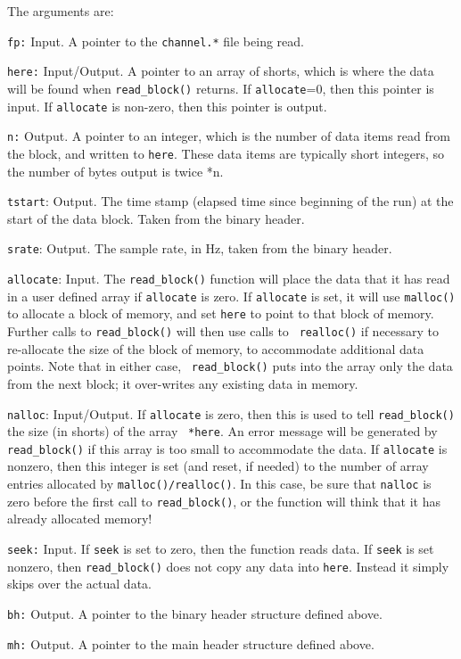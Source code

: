 The arguments are:
\begin{description}
\item{\tt fp:} Input.  A pointer to the {\tt channel.*} file being read.
\item{\tt here:} Input/Output. A pointer to an array of shorts, which
is where the data will be found when {\tt read\_block()} returns.  If
{\tt allocate}=0, then this pointer is input.  If {\tt allocate} is
non-zero, then this pointer is output.
\item{\tt n:} Output.  A pointer to an integer, which is the number of
data items read from the block, and written to {\tt *here}.  These data
items are typically short integers, so the number of bytes output is
twice *n.
\item{\tt tstart}: Output.  The time stamp (elapsed time since beginning of
the run) at the start of the data block.  Taken from the binary
header.
\item{\tt srate}: Output.  The sample rate, in Hz, taken from the binary
header.
\item{\tt allocate}:  Input.   The {\tt read\_block()} function  will place the
data that it has read in a user defined array if {\tt allocate} is
zero.  If {\tt allocate} is set, it will use {\tt malloc()} to allocate
a block of memory, and set {\tt *here} to point to that block of
memory.  Further calls to {\tt read\_block()} will then use calls to {\tt
realloc()} if necessary to re-allocate the size of the block of memory,
to accommodate additional data points.  Note that in either case, {\tt
read\_block()} puts into the array only the data from the next block; it
over-writes any existing data in memory.
\item{\tt nalloc}: Input/Output.   If {\tt allocate} is zero, then this is
used to tell {\tt read\_block()} the size (in shorts) of the array {\tt
*here}.  An error message will be generated by {\tt read\_block()} if
this array is too small to accommodate the data.  If {\tt allocate} is
nonzero, then this integer is set (and reset, if needed) to the number
of array entries allocated by {\tt malloc()/realloc()}.  In this case, be
sure that {\tt *nalloc} is zero before the first call to {\tt read\_block()},
or the function will think that it has already allocated memory!
\item{\tt seek:} Input.  If {\tt seek} is set to zero, then the function
reads data.  If {\tt seek} is set nonzero, then  {\tt read\_block()}
does not copy any data into {\tt *here}.  Instead it simply skips over
the actual data.
\item{\tt bh:} Output.  A pointer to the binary header structure defined above.
\item{\tt mh:} Output.  A pointer to the main header structure defined above.
\end{description}

